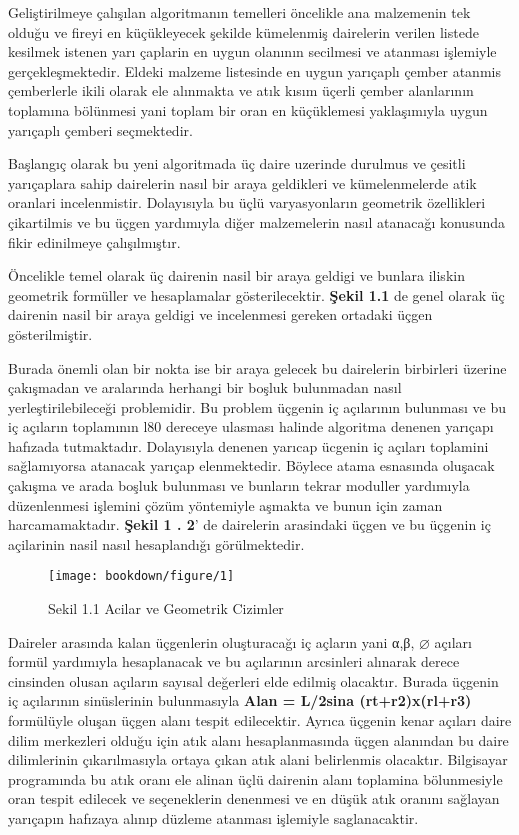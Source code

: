 \documentclass[]{book}
\begin{document}
Geliştirilmeye çalışılan algoritmanın temelleri öncelikle ana malzemenin tek olduğu ve fireyi en küçükleyecek şekilde kümelenmiş dairelerin verilen listede kesilmek istenen yarı çaplarin en uygun olanının secilmesi ve atanması işlemiyle gerçekleşmektedir. Eldeki malzeme listesinde en uygun yarıçaplı çember atanmis çemberlerle ikili olarak ele alınmakta ve atık kısım üçerli çember alanlarının toplamına bölünmesi yani toplam bir oran en küçüklemesi yaklaşımıyla uygun yarıçaplı çemberi seçmektedir.

Başlangıç olarak bu yeni algoritmada üç daire uzerinde durulmus ve çesitli yarıçaplara sahip dairelerin nasıl bir araya geldikleri ve kümelenmelerde atik oranlari incelenmistir. Dolayısıyla bu üçlü varyasyonların geometrik özellikleri çikartilmis ve bu üçgen yardımıyla diğer malzemelerin nasıl atanacağı konusunda fikir edinilmeye çalışılmıştır.

Öncelikle temel olarak üç dairenin nasil bir araya geldigi ve bunlara iliskin geometrik formüller ve hesaplamalar gösterilecektir. \textbf{Şekil 1.1} de genel olarak üç dairenin nasil bir araya geldigi ve incelenmesi gereken ortadaki üçgen gösterilmiştir.

Burada önemli olan bir nokta ise bir araya gelecek bu dairelerin birbirleri üzerine çakışmadan ve aralarında herhangi bir boşluk bulunmadan nasıl yerleştirilebileceği problemidir. Bu problem üçgenin iç açılarının bulunması ve bu iç açıların toplamının l80 dereceye ulasması halinde algoritma denenen yarıçapı hafızada tutmaktadır. Dolayısıyla denenen yarıcap ücgenin iç açıları toplamini sağlamıyorsa atanacak yarıçap elenmektedir. Böylece atama esnasında oluşacak çakışma ve arada boşluk bulunması ve bunların tekrar moduller yardımıyla düzenlenmesi işlemini çözüm yöntemiyle aşmakta ve bunun için zaman harcamamaktadır. \textbf{Şekil 1 . 2}' de dairelerin arasindaki üçgen ve bu üçgenin iç açilarinin nasil nasıl hesaplandığı görülmektedir.

\begin{figure}

{\centering \texttt{[image: bookdown/figure/1]} 

}

\caption{Sekil 1.1 Acilar ve Geometrik Cizimler}\label{fig:pressure}
\end{figure}

Daireler arasında kalan üçgenlerin oluşturacağı iç açların yani α,β, ⌀ açıları formül yardımıyla hesaplanacak ve bu açılarının arcsinleri alınarak derece cinsinden olusan açıların sayısal değerleri elde edilmiş olacaktır. Burada üçgenin iç açılarının sinüslerinin bulunmasıyla \textbf{Alan = L/2sina (rt+r2)x(rl+r3)} formülüyle oluşan üçgen alanı tespit edilecektir. Ayrıca üçgenin kenar açıları daire dilim merkezleri olduğu için atık alanı hesaplanmasında üçgen alanından bu daire dilimlerinin çıkarılmasıyla ortaya çıkan atık alani belirlenmis olacaktır. Bilgisayar programında bu atık oranı ele alinan üçlü dairenin alanı toplamina bölunmesiyle oran tespit edilecek ve seçeneklerin denenmesi ve en düşük atık oranını sağlayan yarıçapın hafızaya alınıp düzleme atanması işlemiyle saglanacaktir.
\end{document}
